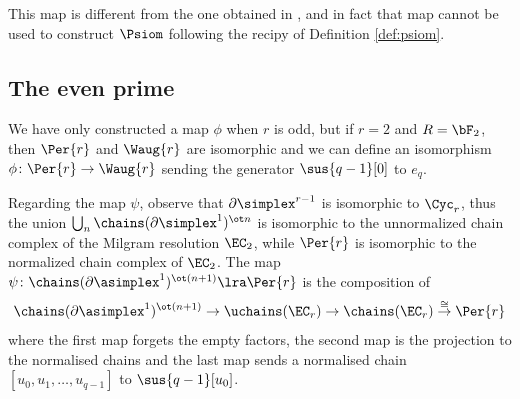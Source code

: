 This map is different from the one obtained in \cite[Prop.~6.16]{brumfiel2023explicit}, and in fact that map cannot be used to construct $\Psiom$ following the recipy of Definition \ref{def:psiom}.



\subsection{The even prime}\label{ss:even} We have only constructed a map $\phi$ when $r$ is odd, but if $r= 2$ and $R=\bF_2$, then $\Per{r}$ and $\Waug{r}$ are isomorphic and we can define an isomorphism $\phi\colon \Per{r}\to \Waug{r}$ sending the generator $\sus{q-1}[0]$ to $e_q$.

Regarding the map $\psi$, observe that $\partial \simplex^{r-1}$ is isomorphic to $\Cyc_r$, thus the union $\bigcup_n \chains(\partial \simplex^1)^{\ot n}$ is isomorphic to the unnormalized chain complex of the Milgram resolution $\EC_2$, while $\Per{r}$ is isomorphic to the normalized chain complex of $\EC_2$. The map $\psi\colon \chains(\partial \asimplex^1)^{\ot (n+1)} \lra \Per{r}$ is the composition of
\[
	\chains(\partial \asimplex^1)^{\ot (n+1)}
	\to
	\uchains(\EC_r)
	\to
	\chains(\EC_r)
	\overset{\cong}{\to}
	\Per{r}
\] 
where the first map forgets the empty factors, the second map is the projection to the normalised chains and the last map sends a normalised chain $[u_0,u_1,\ldots,u_{q-1}]$ to $\sus{q-1}[u_0]$. 

